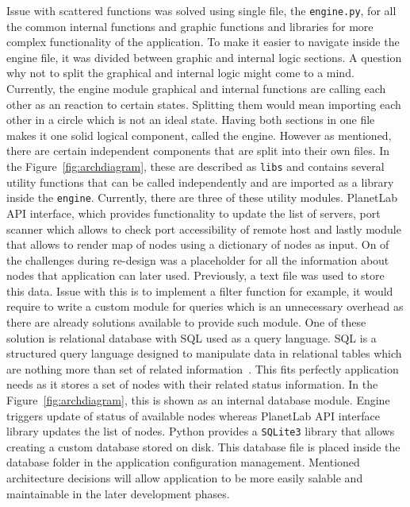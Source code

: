 Issue with scattered functions was solved using single file, the \texttt{engine.py}, for all the common internal functions and graphic functions and libraries for more complex functionality of the application. To make it easier to navigate inside the engine file, it was divided between graphic and internal logic sections. A question why not to split the graphical and internal logic might come to a mind. Currently, the engine module graphical and internal functions are calling each other as an reaction to certain states. Splitting them would mean importing each other in a circle which is not an ideal state. Having both sections in one file makes it one solid logical component, called the engine. However as mentioned, there are certain independent components that are split into their own files. In the Figure~\ref{fig:archdiagram}, these are described as \texttt{libs} and contains several utility functions that can be called independently and are imported as a library inside the \texttt{engine}. Currently, there are three of these utility modules. PlanetLab API interface, which provides functionality to update the list of servers, port scanner which allows to check port accessibility of remote host and lastly module that allows to render map of nodes using a dictionary of nodes as input. On of the challenges during re-design was a placeholder for all the information about nodes that application can later used. Previously, a text file was used to store this data. Issue with this is to implement a filter function for example, it would require to write a custom module for queries which is an unnecessary overhead as there are already solutions available to provide such module. One of these solution is relational database with SQL used as a query language. SQL is a structured query language designed to manipulate data in relational tables which are nothing more than set of related information~\cite{Beaulieu:2005:LS:1098720}. This fits perfectly application needs as it stores a set of nodes with their related status information. In the Figure~\ref{fig:archdiagram}, this is shown as an internal database module. Engine triggers update of status of available nodes whereas PlanetLab API interface library updates the list of nodes. Python provides a \texttt{SQLite3} library that allows creating a custom database stored on disk. This database file is placed inside the database folder in the application configuration management. Mentioned architecture decisions will allow application to be more easily salable and maintainable in the later development phases.\\


